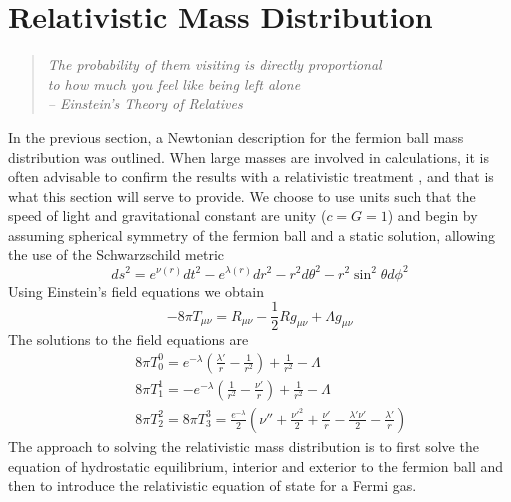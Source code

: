 \section{Relativistic Mass Distribution}
\begin{quotation}
	\raggedleft \it The probability of them visiting is directly proportional\\ to how much you feel like being left alone \\
-- Einstein's Theory of Relatives
\end{quotation}
In the previous section, a Newtonian description for the fermion ball mass distribution was outlined. When large
masses are involved in calculations, it is often advisable to confirm the results with a relativistic treatment \cite{ref_bilic}, and
that is what this section will serve to provide. We choose to use units such that the speed of light and gravitational constant
are unity ($c=G=1$) and begin by assuming spherical symmetry of the fermion ball and a static solution, allowing the use of the
Schwarzschild metric
\begin{equation}
	ds^2=e^{\nu(r)}dt^2 - e^{\lambda(r)}dr^2 - r^2d\theta^2 - r^2 \sin^2\theta d\phi^2
	\label{eqn_schwarzschild}
\end{equation}
Using Einstein's field equations we obtain
\begin{equation}
	-8 \pi T_{\mu \nu} = R _{\mu \nu} - \frac{1}{2} R g_{\mu \nu} + \Lambda g_{\mu \nu}
	\label{eqn_einstein}
\end{equation}
The solutions to the field equations \cite{ref_tolmanpaper} are
\begin{eqnarray}
	&& 8 \pi T_0^0 = e^{- \lambda} \left(\frac{\lambda'}{r} - \frac{1}{r^2} \right) + \frac{1}{r^2} - \Lambda
	\label{eqn_einsteinsoln1} \\
	&& 8 \pi T_1^1 = - e^{- \lambda} \left(\frac{1}{r^2} - \frac{\nu'}{r} \right) + \frac{1}{r^2} - \Lambda
	\label{eqn_einsteinsoln2} \\
	&& 8 \pi T_2^2 = 8 \pi T_3^3 = \frac{e^{- \lambda}}{2} \left(\nu'' + \frac{\nu'^2}{2} + \frac{\nu'}{r} - \frac{\lambda'\nu'}{2}
	-\frac{\lambda'}{r} \right)
	\label{eqn_einsteinsoln3}
\end{eqnarray}
The approach to solving the relativistic mass distribution is to first solve the equation of hydrostatic equilibrium, interior and
exterior to the fermion ball and then to introduce the relativistic equation of state for a Fermi gas.

